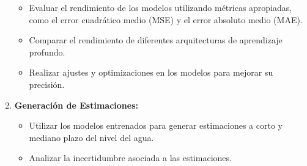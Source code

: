 \documentclass[12pt]{article}
\begin{document}
\begin{enumerate}
\begin{itemize}
        \item Evaluar el rendimiento de los modelos utilizando métricas apropiadas, como el error cuadrático medio (MSE) y el error absoluto medio (MAE).
        \item Comparar el rendimiento de diferentes arquitecturas de aprendizaje profundo.
        \item Realizar ajustes y optimizaciones en los modelos para mejorar su precisión.
    \end{itemize}
    \item \textbf{Generación de Estimaciones:}
    \begin{itemize}
        \item Utilizar los modelos entrenados para generar estimaciones a corto y mediano plazo del nivel del agua.
        \item Analizar la incertidumbre asociada a las estimaciones.
    \end{itemize}
\end{enumerate}

\printbibliography
\end{document}
